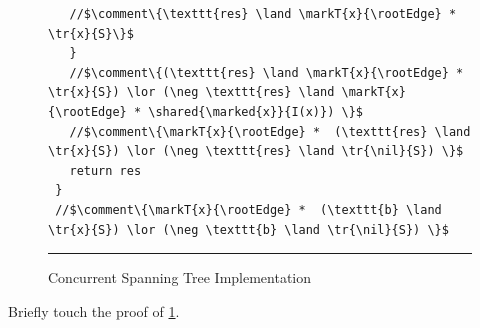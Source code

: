 \begin{figure}
\begin{lstlisting}
   //$\comment\{\texttt{res} \land \markT{x}{\rootEdge} *  \tr{x}{S}\}$      
   }		
   //$\comment\{(\texttt{res} \land \markT{x}{\rootEdge} * \tr{x}{S}) \lor (\neg \texttt{res} \land \markT{x}{\rootEdge} * \shared{\marked{x}}{I(x)}) \}$   
   //$\comment\{\markT{x}{\rootEdge} *  (\texttt{res} \land \tr{x}{S}) \lor (\neg \texttt{res} \land \tr{\nil}{S}) \}$      
   return res
 }
 //$\comment\{\markT{x}{\rootEdge} *  (\texttt{b} \land \tr{x}{S}) \lor (\neg \texttt{b} \land \tr{\nil}{S}) \}$      
\end{lstlisting}
\hrule\vspace*{5pt}
\caption{Concurrent Spanning Tree Implementation}
\label{fig:conSpanningTree}
\end{figure}
%

\todo Briefly touch the proof of \fig\ref{fig:conSpanningTree}.


